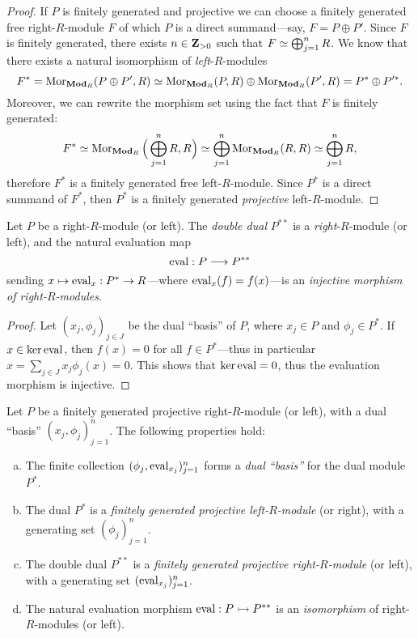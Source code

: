 \begin{proof}
If \(P\) is finitely generated and projective we can choose a finitely generated
free right-\(R\)-module \(F\) of which \(P\) is a direct summand---say, \(F = P
\oplus P'\). Since \(F\) is finitely generated, there exists \(n \in \mathbf{Z}_{> 0}\)
such that \(F \simeq \bigoplus_{j=1}^n R\). We know that there exists a natural
isomorphism of \emph{left}-\(R\)-modules
\[
F^{*} = \operatorname{Mor}_{{\textbf{Mod}_{R}}}(P \oplus P', R)
\simeq \operatorname{Mor}_{{\textbf{Mod}_{R}}}(P, R) \oplus \operatorname{Mor}_{{\textbf{Mod}_{R}}}(P', R)
= P^{*} \oplus P'^{*}.
\]
Moreover, we can rewrite the morphism set using the fact that \(F\) is finitely
generated:
\[
F^{*} \simeq \operatorname{Mor}_{{\textbf{Mod}_{R}}}\Big(\bigoplus_{j=1}^n R, R\Big)
\simeq \bigoplus_{j=1}^n \operatorname{Mor}_{{\textbf{Mod}_{R}}}(R, R)
\simeq \bigoplus_{j=1}^n R,
\]
therefore \(F^{*}\) is a finitely generated free left-\(R\)-module. Since
\(P^{*}\) is a direct summand of \(F^{*}\), then \(P^{*}\) is a finitely
generated \emph{projective} left-\(R\)-module.
\end{proof}

\begin{proposition}
\label{prop:projective-module-evaluation-morphism-is-injective}
Let \(P\) be a right-\(R\)-module (or left). The \emph{double dual} \(P^{* *}\)
is a \emph{right}-\(R\)-module (or left), and the natural evaluation map
\[
\operatorname{eval}: P \longrightarrow P^{* *}
\]
sending \(x \mapsto \operatorname{eval}_x: P^{*} \to R\)---where \(\operatorname{eval}_x(f) = f(x)\)---is an
\emph{injective morphism of right-\(R\)-modules}.
\end{proposition}

\begin{proof}
Let \((x_j, \phi_j)_{j \in J}\) be the dual ``basis'' of \(P\), where
\(x_j \in P\) and \(\phi_j \in P^{*}\). If \(x \in \ker \operatorname{eval}\), then
\(f(x) = 0\) for all \(f \in P^{*}\)---thus in particular \(x = \sum_{j \in J}
x_j \phi_j(x) = 0\). This shows that \(\ker \operatorname{eval} = 0\), thus the evaluation
morphism is injective.
\end{proof}

\begin{proposition}
\label{prop:properties-of-fg-proj-modules-and-duals}
Let \(P\) be a finitely generated projective right-\(R\)-module (or left), with
a dual ``basis'' \((x_j, \phi_j)_{j=1}^n\). The following properties hold:
\begin{enumerate}[(a)]\setlength\itemsep{0em}
\item The finite collection \((\phi_j, \operatorname{eval}_{x_j})_{j=1}^n\) forms a \emph{dual
  ``basis''} for the dual module \(P^{*}\).
\item The dual \(P^{*}\) is a \emph{finitely generated projective
    left-\(R\)-module} (or right), with a generating set \((\phi_j)_{j=1}^n\).
\item The double dual \(P^{* *}\) is a \emph{finitely generated projective
    right-\(R\)-module} (or left), with a generating set
  \((\operatorname{eval}_{x_j})_{j=1}^n\).
\item The natural evaluation morphism \(\operatorname{eval}: P \rightarrowtail P^{* *}\) is an
  \emph{isomorphism} of right-\(R\)-modules (or left).
\end{enumerate}
\end{proposition}

